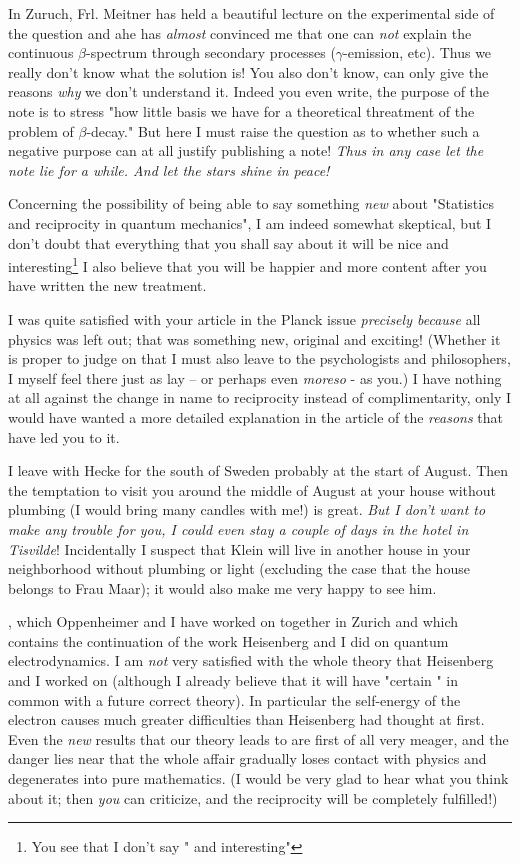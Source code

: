\documentclass{article}
\begin{document}
In Zuruch, Frl. Meitner has held a beautiful lecture on the experimental side of the question and ahe has \textit{almost} convinced me that one can \textit{not} explain the continuous $\beta$-spectrum through secondary processes ($\gamma$-emission, etc). Thus we really don't know what the solution is! You also don't know, can only give the reasons \textit{why} we don't understand it. Indeed you even write, the purpose of the note is to stress "how little basis we have for a theoretical threatment of the problem of $\beta$-decay." But here I must raise the question as to whether such a negative purpose can at all justify publishing a note! \textit{Thus in any case let the note lie for a while. And let the stars shine in peace!}

Concerning the possibility of being able to say something \textit{new} about "Statistics and reciprocity in quantum mechanics", I am indeed somewhat skeptical, but I don't doubt that everything that you shall say about it will be nice and interesting\footnote{You see that I don't say " and interesting"} I also believe that you will be happier and more content after you have written the new treatment.

I was quite satisfied with your article in the Planck issue \textit{precisely because} all physics was left out; that was something new, original and exciting! (Whether it is proper to judge on that I must also leave to the psychologists and philosophers, I myself feel there just as lay -- or perhaps even \textit{moreso} - as you.) I have nothing at all against the change in name to reciprocity instead of complimentarity, only I would have wanted a more detailed explanation in the article of the \textit{reasons} that have led you to it.

I leave with Hecke for the south of Sweden probably at the start of August. Then the temptation to visit you around the middle of August at your house without plumbing (I would bring many candles with me!) is great. \textit{But I don't want to make any trouble for you, I could even stay a couple of days in the hotel in Tisvilde}! Incidentally I suspect that Klein will live in another house in your neighborhood without plumbing or light (excluding the case that the house belongs to Frau Maar); it would also make me very happy to see him.

, which Oppenheimer and I have worked on together in Zurich and which contains the continuation of the work Heisenberg and I did on quantum electrodynamics. I am \textit{not} very satisfied with the whole theory that Heisenberg and I worked on (although I already believe that it will have "certain " in common with a future correct theory). In particular the self-energy of the electron causes much greater difficulties than Heisenberg had thought at first. Even the \textit{new} results that our theory leads to are first of all very meager, and the danger lies near that the whole affair gradually loses contact with physics and degenerates into pure mathematics. (I would be very glad to hear what you think about it; then \textit{you} can criticize, and the reciprocity will be completely fulfilled!)
\end{document}
